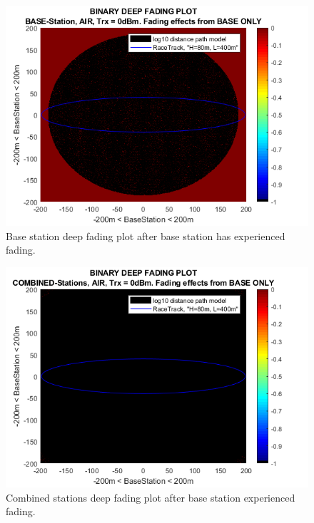 \begin{figure}[h]
	\centering
	\includegraphics[width=\linewidth]{theory/fading/fig/binaryDeepFading_baseStation_baseOnly.png}
	\caption{Base station deep fading plot after base station has experienced fading.}
	\label{fig:binaryDeepFading_baseStation_baseOnly}
\end{figure}

\begin{figure}[h]
	\centering
	\includegraphics[width=\linewidth]{theory/fading/fig/binaryDeepFading_combinedStations_baseOnly.png}
	\caption{Combined stations deep fading plot after base station experienced fading.}
	\label{fig:binaryDeepFading_combinedStations_baseOnly}
\end{figure}

